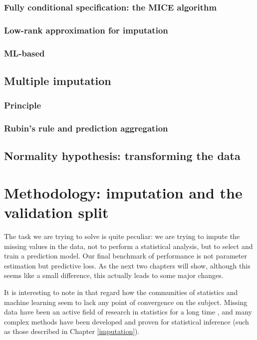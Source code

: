 \documentclass[12pt, a4paper]{memoir}
\begin{document}
		\subsection{Fully conditional specification: the MICE algorithm}
		\subsection{Low-rank approximation for imputation}
		\subsection{ML-based}
	\section{Multiple imputation}
		\subsection{Principle}
		\subsection{Rubin's rule and prediction aggregation}
	\section{Normality hypothesis: transforming the data}
		
\chapter{Methodology: imputation and the validation split}
\label{validation}
The task we are trying to solve is quite peculiar: we are trying to impute the missing values in the data, not to perform a statistical analysis, but to select and train a prediction model. Our final benchmark of performance is not parameter estimation but predictive loss. As the next two chapters will show, although this seems like a small difference, this actually leads to some major changes.

It is interesting to note in that regard how the communities of statistics and machine learning seem to lack any point of convergence on the subject. Missing data have been an active field of research in statistics for a long time \cite{rubin1976inference}, and many complex methods have been developed and proven for statistical inference \cite{Rubin_missdata} (such as those described in Chapter \ref{imputation}).
\end{document}
